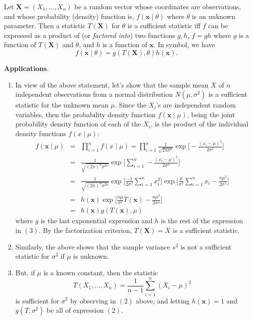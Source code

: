\documentclass[12pt]{article}
\begin{document}
Let $\boldsymbol{X}=(X_1,\ldots,X_n)$ be a random vector whose
coordinates are observations, and whose probability (density)
function is, $f(\boldsymbol{x}\mid\theta)$ where $\theta$ is an
unknown parameter.  Then a statistic $T(\boldsymbol{X})$ for
$\theta$ is a sufficient statistic iff $f$ can be expressed as a
product of (or \emph{factored into}) two functions $g,h$, $f=gh$
where $g$ is a function of $T(\boldsymbol{X})$ and $\theta$, and $h$
is a function of $\boldsymbol{x}$.  In symbol, we have
$$f(\boldsymbol{x}\mid\theta)=g(T(\boldsymbol{X}),\theta)h(\boldsymbol{x}).$$

\textbf{Applications}.
\begin{enumerate}
\item In view of the above statement, let's show that the sample
mean $\overline{X}$ of $n$ independent observations from a normal
distribution $N(\mu,\sigma^2)$ is a sufficient statistic for the
unknown mean $\mu$. Since the $X_i$'s are independent random
variables, then the probability density function
$f(\boldsymbol{x}\mid\mu)$, being the joint probability density
function of each of the $X_i$, is the product of the individual
density functions $f(x\mid\mu)$:
\begin{eqnarray}
f(\boldsymbol{x}\mid\mu)&=&\prod_{i=1}^n f(x\mid\mu)= \prod_{i=1}^n
\frac{1}{\sqrt{2\pi\sigma^2}}\exp\Big[-\frac{(x_i-\mu)^2}{2\sigma^2}\Big]\\
&=&\frac{1}{\sqrt{(2\pi)^n\sigma^{2n}}}\exp\Big
[\sum_{i=1}^{n}-\frac{(x_i-\mu)^2}{2\sigma^2}\Big]\\
&=&\frac{1}{\sqrt{(2\pi)^n\sigma^{2n}}}\exp\Big
[\frac{-1}{2\sigma^2}\sum_{i=1}^{n}x_i^2\Big]
\exp\Big[\frac{\mu}{\sigma^2}\sum_{i=1}^n
x_i-\frac{n\mu^2}{2\sigma^2}\Big]\\
&=&h(\boldsymbol{x})
\exp\Big[\frac{n\mu}{\sigma^2}T(\boldsymbol{x})-\frac{n\mu^2}{2\sigma^2}\Big]\\
&=&h(\boldsymbol{x}) g(T(\boldsymbol{x}),\mu)
\end{eqnarray}
where $g$ is the last exponential expression and $h$ is the rest of
the expression in $(3)$.  By the factorization criterion,
$T(\boldsymbol{X})=\overline{X}$ is a sufficient statistic.
\item Similarly, the above shows that the sample variance $s^2$ is
not a sufficient statistic for $\sigma^2$ if $\mu$ is unknown.
\item But, if $\mu$ is a known constant, then the statistic
$$T(X_1,\ldots,X_n)=\frac{1}{n-1}\sum_{i=1}^{n}(X_i-\mu)^2$$
is sufficient for $\sigma^2$ by observing in $(2)$ above, and
letting $h(\boldsymbol{x})=1$ and $g(T,\sigma^2)$ be all of
expression $(2)$.
\end{enumerate}
\end{document}
